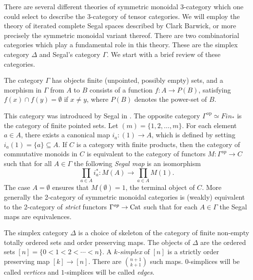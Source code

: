 \documentclass{amsart}
\begin{document}
There are several different theories of symmetric monoidal 3-category which one could select to describe the 3-category of tensor categories. We will employ the theory of iterated complete Segal spaces described by Clark Barwick,  or more precisely the symmetric monoidal variant thereof. There are two combinatorial categories which play a fundamental role in this theory. These are the simplex category $\Delta$ and Segal's category $\Gamma$. We start with a brief review of these categories. 

\begin{definition}
	The category  $\Gamma$ has objects finite (unpointed, possibly empty) sets, and a morphism in $\Gamma$ from $A$ to $B$ consists of a function $f: A \to P(B)$, satisfying $f(x) \cap f(y) = \emptyset$ if $x \neq y$, where $P(B)$ denotes the power-set of $B$. 
\end{definition}

This category was introduced by Segal in \cite{Segal-Categories and Cohomology Theories}.  The opposite category $\Gamma^\textrm{op} \simeq Fin_*$ is the category of finite pointed sets. Let $(m) = \{ 1, 2, \dots, m\}$. For each element $a \in A$, there exists a canonical map $i_a: (1) \to A$, which is defined by setting $i_a(1) = \{a\} \subseteq A$. If $C$ is a category with finite products, then the category of commutative monoids in $C$ is equivalent to the category of functors $M:\Gamma^{op} \to C$ such that for all $A\in \Gamma$ the following {\em Segal map} is an isomorphism
\begin{equation*}
	\prod_{a \in A} i_a^*: M(A) \to \prod_{a \in A} M(1).
\end{equation*}
The case $A=\emptyset$ ensures that $M(\emptyset) = 1$, the terminal object of $C$. More generally the 2-category of symmetric monoidal categories is (weakly) equivalent to the 2-category of {\em strict} functors $\Gamma^{op} \to \mathrm{Cat}$ such that for each $A \in \Gamma$ the Segal maps are equivalences. 

\begin{definition}
	The simplex category $\Delta$ is a choice of skeleton of the category of finite non-empty totally ordered sets and order preserving maps. The objects of $\Delta$ are the ordered sets $[n] = \{ 0 < 1 < 2 < \cdots < n\}$. A {\em $k$-simplex} of $[n]$ is a strictly order preserving map $[k] \to [n]$. There are $ {n+1}\choose {k+1}$ such maps. $0$-simplices will be called {\em vertices} and $1$-simplices will be called {\em edges}. 
\end{definition}
\end{document}
